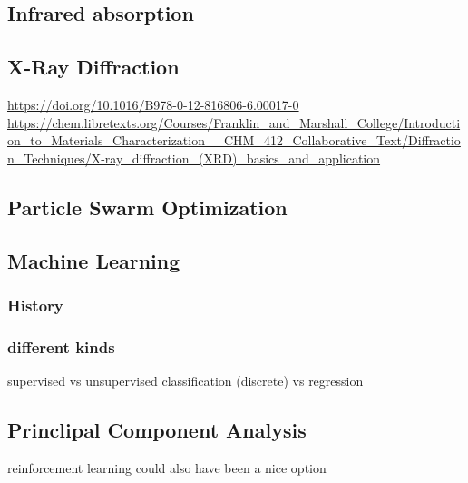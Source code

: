 \subsection{Infrared absorption}
\subsection{X-Ray Diffraction}
\url{https://doi.org/10.1016/B978-0-12-816806-6.00017-0}\\
\url{https://chem.libretexts.org/Courses/Franklin_and_Marshall_College/Introduction_to_Materials_Characterization__CHM_412_Collaborative_Text/Diffraction_Techniques/X-ray_diffraction_(XRD)_basics_and_application}\\
\subsection{Particle Swarm Optimization}
\subsection{Machine Learning}
\subsubsection{History}
\subsubsection{different kinds} 
supervised vs unsupervised
classification (discrete) vs regression
\subsection{Princlipal Component Analysis}
reinforcement learning could also have been a nice option
